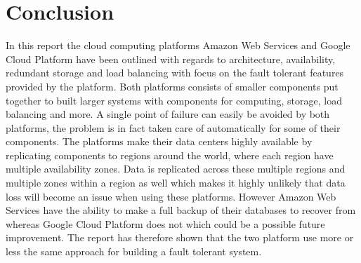 \documentclass[11pt]{report}
\begin{document}
\chapter{Conclusion}
In this report the cloud computing platforms Amazon Web Services and Google Cloud Platform have been outlined with regards to architecture, availability, redundant storage and load balancing with focus on the fault tolerant features provided by the platform. Both platforms consists of smaller components put together to built larger systems with components for computing, storage, load balancing and more. A single point of failure can easily be avoided by both platforms, the problem is in fact taken care of automatically for some of their components. The platforms make their data centers highly available by replicating components to regions around the world, where each region have multiple availability zones. Data is replicated across these multiple regions and multiple zones within a region as well which makes it highly unlikely that data loss will become an issue when using these platforms. However Amazon Web Services have the ability to make a full backup of their databases to recover from whereas Google Cloud Platform does not which could be a possible future improvement. The report has therefore shown that the two platform use more or less the same approach for building a fault tolerant system.
\end{document}
